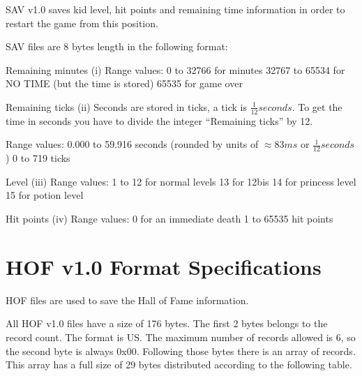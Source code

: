 \documentclass{article}
\begin{document}
 SAV v1.0 saves kid level, hit points and remaining time information in
 order to restart the game from this position.

 SAV files are 8 bytes length in the following format:


 Remaining minutes (i)
  Range values:
   0     to 32766 for minutes
   32767 to 65534 for NO TIME (but the time is stored)
   65535 for game over

 Remaining ticks (ii)
  Seconds are stored in ticks, a tick is $\frac{1}{12} seconds$. To get the time in
  seconds you have to divide the integer ``Remaining ticks'' by 12.

  Range values:
   0.000 to 59.916 seconds
                   (rounded by units of $\approx 83 ms$ or $\frac{1}{12} seconds$)
   0     to 719    ticks

 Level (iii)
  Range values:
   1  to 12 for normal levels
   13 for 12bis
   14 for princess level
   15 for potion level

 Hit points (iv)
  Range values:
   0 for an immediate death
   1 to 65535 hit points


\section{HOF v1.0 Format Specifications}

 HOF files are used to save the Hall of Fame information.

 All HOF v1.0 files have a size of 176 bytes. The first 2 bytes belongs to
 the record count. The format is US. The maximum number of records allowed
 is 6, so the second byte is always 0x00.
 Following those bytes there is an array of records. This array has a full
 size of 29 bytes distributed according to the following table.

\end{document}
